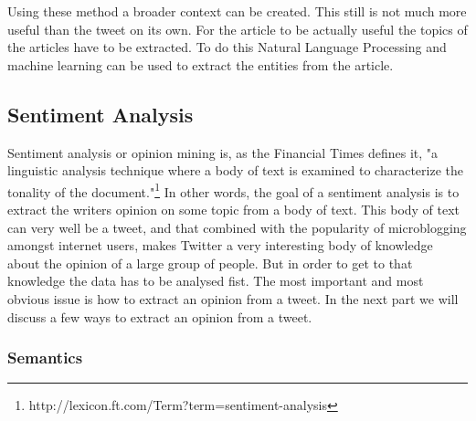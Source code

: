\documentclass{article}
\begin{document}
Using these method a broader context can be created. This still is not much more useful than the tweet on its own. For the article to be actually useful the topics of the articles have to be extracted. To do this Natural Language Processing and machine learning can be used to extract the entities from the article.  

\subsection{Sentiment Analysis}

Sentiment analysis or opinion mining is, as the Financial Times defines it, "a linguistic analysis technique where a body of text is examined to characterize the tonality of the document."\footnote{http://lexicon.ft.com/Term?term=sentiment-analysis} In other words, the goal of a sentiment analysis is to extract the writers opinion on some topic from a body of text. This body of text can very well be a tweet, and that combined with the popularity of microblogging amongst internet users, makes Twitter a very interesting body of knowledge about the opinion of a large group of people. But in order to get to that knowledge the data has to be analysed fist. 
The most important and most obvious issue is how to extract an opinion from a tweet. In the next part we will discuss a few ways to extract an opinion from a tweet.

\subsubsection*{Semantics}
\end{document}

